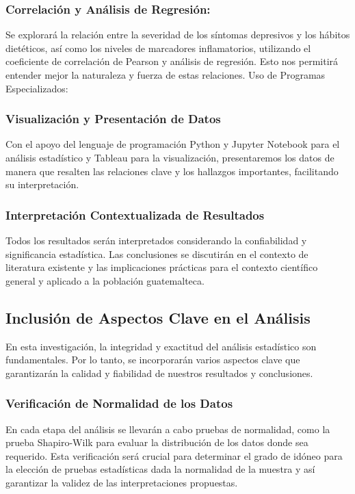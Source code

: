 \documentclass[jou]{apa7}
\begin{document}
	
	\subsubsection{Correlación y Análisis de Regresión:} Se explorará la relación
	entre la severidad de los síntomas depresivos y los hábitos dietéticos,
	así como los niveles de marcadores inflamatorios, utilizando el
	coeficiente de correlación de Pearson y análisis de regresión. Esto nos
	permitirá entender mejor la naturaleza y fuerza de estas relaciones. Uso
	de Programas Especializados:
	
	\subsubsection{Visualización y Presentación de Datos}
	Con el apoyo del lenguaje de programación Python y Jupyter Notebook para el análisis estadístico y Tableau para la visualización, presentaremos los datos de manera que resalten las relaciones clave y los hallazgos importantes, facilitando su interpretación.
	
	\subsubsection{Interpretación Contextualizada de Resultados}
	Todos los resultados serán interpretados considerando la confiabilidad y significancia estadística. Las conclusiones se discutirán en el contexto de literatura existente y las implicaciones prácticas para el contexto científico general y aplicado a la población guatemalteca.
	
	
	\subsection{Inclusión de Aspectos Clave en el Análisis}\label{inclusiuxf3n-de-aspectos-clave-en-el-anuxe1lisis}
	
	En esta investigación, la integridad y exactitud del análisis
	estadístico son fundamentales. Por lo tanto, se incorporarán varios
	aspectos clave que garantizarán la calidad y fiabilidad de nuestros
	resultados y conclusiones.\\
	
	
	\subsubsection{Verificación de Normalidad de los Datos} 
	
	En cada etapa del análisis se llevarán a cabo pruebas de normalidad, como la prueba	Shapiro-Wilk para evaluar la distribución de los datos donde sea
	requerido. Esta verificación será crucial para determinar el grado de
	idóneo para la elección de pruebas estadísticas dada la normalidad de la
	muestra y así garantizar la validez de las interpretaciones propuestas.
	
\end{document}
